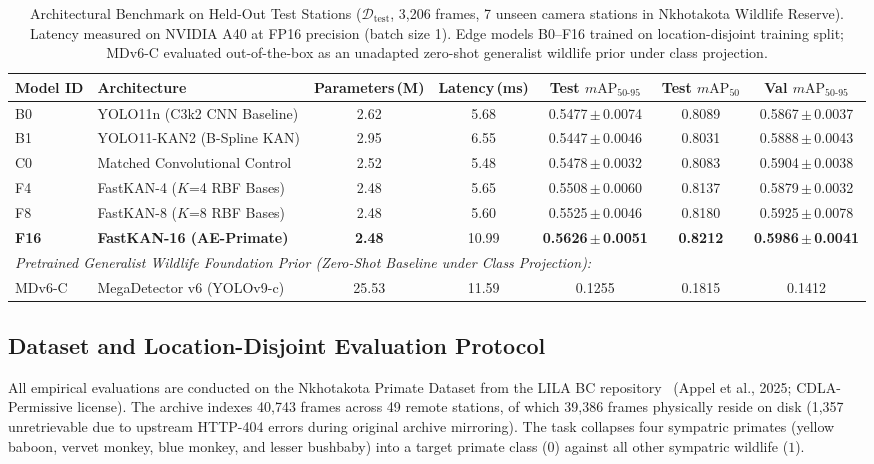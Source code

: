 \documentclass[conference]{IEEEtran}
\begin{document}
\begin{table}[t]
\centering
\caption{Architectural Benchmark on Held-Out Test Stations ($\mathcal{D}_\text{test}$, 3,206 frames, 7 unseen camera stations in Nkhotakota Wildlife Reserve). Latency measured on NVIDIA A40 at FP16 precision (batch size 1). Edge models B0--F16 trained on location-disjoint training split; MDv6-C evaluated out-of-the-box as an unadapted zero-shot generalist wildlife prior under class projection.}
\label{tab:model_comparison}
\begin{tabular}{llccccc}
\toprule
Model ID & Architecture & Parameters\,(M) & Latency\,(ms) & Test $m\text{AP}_{50\text{-}95}$ & Test $m\text{AP}_{50}$ & Val $m\text{AP}_{50\text{-}95}$ \\
\midrule
B0  & YOLO11n (C3k2 CNN Baseline)       & 2.62 & 5.68  & 0.5477\,$\pm$\,0.0074 & 0.8089 & 0.5867\,$\pm$\,0.0037 \\
B1  & YOLO11-KAN2 (B-Spline KAN)        & 2.95 & 6.55  & 0.5447\,$\pm$\,0.0046 & 0.8031 & 0.5888\,$\pm$\,0.0043 \\
C0  & Matched Convolutional Control     & 2.52 & 5.48  & 0.5478\,$\pm$\,0.0032 & 0.8083 & 0.5904\,$\pm$\,0.0038 \\
F4  & FastKAN-4 ($K$=4 RBF Bases)       & 2.48 & 5.65  & 0.5508\,$\pm$\,0.0060 & 0.8137 & 0.5879\,$\pm$\,0.0032 \\
F8  & FastKAN-8 ($K$=8 RBF Bases)       & 2.48 & 5.60  & 0.5525\,$\pm$\,0.0046 & 0.8180 & 0.5925\,$\pm$\,0.0078 \\
\textbf{F16} & \textbf{FastKAN-16 (AE-Primate)} & \textbf{2.48} & 10.99 & \textbf{0.5626\,$\pm$\,0.0051} & \textbf{0.8212} & \textbf{0.5986\,$\pm$\,0.0041} \\
\midrule
\multicolumn{7}{l}{\textit{Pretrained Generalist Wildlife Foundation Prior (Zero-Shot Baseline under Class Projection):}} \\
MDv6-C & MegaDetector v6 (YOLOv9-c)~\cite{beery2019efficient} & 25.53 & 11.59 & 0.1255 & 0.1815 & 0.1412 \\
\bottomrule
\end{tabular}
\end{table}

\subsection{Dataset and Location-Disjoint Evaluation Protocol}
\label{sec:dataset}
All empirical evaluations are conducted on the Nkhotakota Primate Dataset from the LILA BC repository~\cite{wearn2019camera} (Appel et al., 2025; CDLA-Permissive license). The archive indexes 40,743 frames across 49 remote stations, of which 39,386 frames physically reside on disk (1,357 unretrievable due to upstream HTTP-404 errors during original archive mirroring). The task collapses four sympatric primates (yellow baboon, vervet monkey, blue monkey, and lesser bushbaby) into a target primate class ($0$) against all other sympatric wildlife ($1$).
\end{document}
